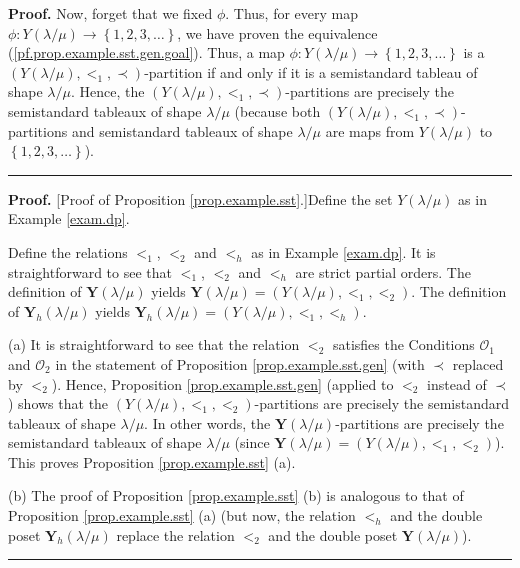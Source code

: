 \documentclass[numbers=enddot,12pt,final,onecolumn,notitlepage,abstracton]{scrartcl}
\theoremstyle{definition}
\newenvironment{proof}[1][Proof]{\noindent\textbf{#1.} }{\ \rule{0.5em}{0.5em}}
\newenvironment{verlong}{}{}
\begin{document}
\begin{verlong}
\begin{footnotesize}
\begin{proof}
Now, forget that we fixed $\phi$. Thus, for every map $\phi:Y\left(
\lambda/\mu\right)  \rightarrow\left\{  1,2,3,\ldots\right\}  $, we have
proven the equivalence (\ref{pf.prop.example.sst.gen.goal}). Thus, a map
$\phi:Y\left(  \lambda/\mu\right)  \rightarrow\left\{  1,2,3,\ldots\right\}  $
is a $\left(  Y\left(  \lambda/\mu\right)  ,<_{1},\prec\right)  $-partition if
and only if it is a semistandard tableau of shape $\lambda/\mu$. Hence, the
$\left(  Y\left(  \lambda/\mu\right)  ,<_{1},\prec\right)  $-partitions are
precisely the semistandard tableaux of shape $\lambda/\mu$ (because both
$\left(  Y\left(  \lambda/\mu\right)  ,<_{1},\prec\right)  $-partitions and
semistandard tableaux of shape $\lambda/\mu$ are maps from $Y\left(
\lambda/\mu\right)  $ to $\left\{  1,2,3,\ldots\right\}  $).
\end{proof}

\begin{proof}
[Proof of Proposition \ref{prop.example.sst}.]Define the set $Y\left(
\lambda/\mu\right)  $ as in Example \ref{exam.dp}.

Define the relations $<_{1}$, $<_{2}$ and $<_{h}$ as in Example \ref{exam.dp}.
It is straightforward to see that $<_{1}$, $<_{2}$ and $<_{h}$ are strict
partial orders. The definition of $\mathbf{Y}\left(  \lambda/\mu\right)  $
yields $\mathbf{Y}\left(  \lambda/\mu\right)  =\left(  Y\left(  \lambda
/\mu\right)  ,<_{1},<_{2}\right)  $. The definition of $\mathbf{Y}_{h}\left(
\lambda/\mu\right)  $ yields $\mathbf{Y}_{h}\left(  \lambda/\mu\right)
=\left(  Y\left(  \lambda/\mu\right)  ,<_{1},<_{h}\right)  $.

(a) It is straightforward to see that the relation $<_{2}$ satisfies the
Conditions $\mathcal{O}_{1}$ and $\mathcal{O}_{2}$ in the statement of
Proposition \ref{prop.example.sst.gen} (with $\prec$ replaced by $<_{2}$).
Hence, Proposition \ref{prop.example.sst.gen} (applied to $<_{2}$ instead of
$\prec$) shows that the $\left(  Y\left(  \lambda/\mu\right)  ,<_{1}%
,<_{2}\right)  $-partitions are precisely the semistandard tableaux of shape
$\lambda/\mu$. In other words, the $\mathbf{Y}\left(  \lambda/\mu\right)
$-partitions are precisely the semistandard tableaux of shape $\lambda/\mu$
(since $\mathbf{Y}\left(  \lambda/\mu\right)  =\left(  Y\left(  \lambda
/\mu\right)  ,<_{1},<_{2}\right)  $). This proves Proposition
\ref{prop.example.sst} (a).

(b) The proof of Proposition \ref{prop.example.sst} (b) is analogous to that
of Proposition \ref{prop.example.sst} (a) (but now, the relation $<_{h}$ and
the double poset $\mathbf{Y}_{h}\left(  \lambda/\mu\right)  $ replace the
relation $<_{2}$ and the double poset $\mathbf{Y}\left(  \lambda/\mu\right)  $).
\end{proof}


\end{footnotesize}
\end{verlong}
\end{document}
